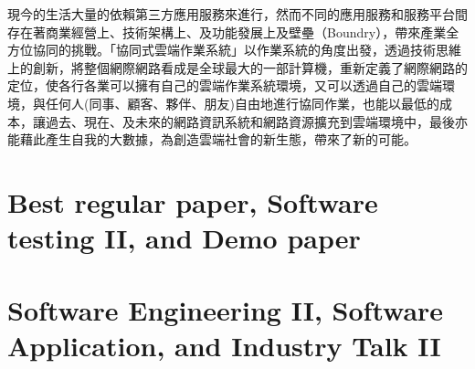 \documentclass[12pt,oneside,a4paper]{book}
\begin{document}
現今的生活大量的依賴第三方應用服務來進行，然而不同的應用服務和服務平台間存在著商業經營上、技術架構上、及功能發展上及壁壘（Boundry），帶來產業全方位協同的挑戰。「協同式雲端作業系統」以作業系統的角度出發，透過技術思維上的創新，將整個網際網路看成是全球最大的一部計算機，重新定義了網際網路的定位，使各行各業可以擁有自己的雲端作業系統環境，又可以透過自己的雲端環境，與任何人(同事、顧客、夥伴、朋友)自由地進行協同作業，也能以最低的成本，讓過去、現在、及未來的網路資訊系統和網路資源擴充到雲端環境中，最後亦能藉此產生自我的大數據，為創造雲端社會的新生態，帶來了新的可能。


\chapter{Best regular paper, Software testing II, and Demo paper}

\TimeThree

\section{\TitleThreeA}
\subsection*{\ChairThreeA}
\ListThreeA
\PaperThreeA


\section{\TitleThreeB}
\subsection*{\ChairThreeB}
\ListThreeB
\PaperThreeB

\section{\TitleThreeC}
\subsection*{\ChairThreeC}
\ListThreeC
\PaperThreeC

\chapter{Software Engineering II, Software Application, and Industry Talk II}
\TimeFour

\section{\TitleFourA}
\end{document}
